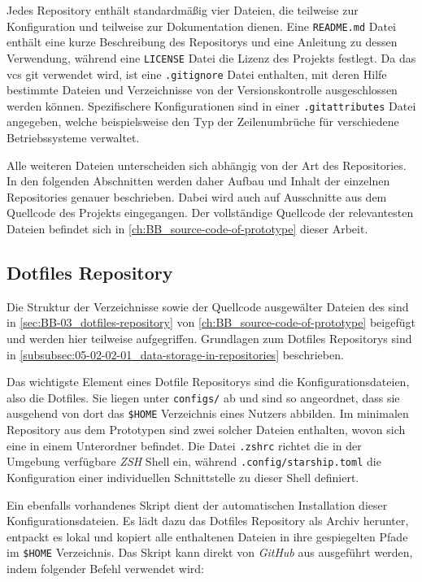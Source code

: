 Jedes Repository enthält standardmäßig vier Dateien, die teilweise zur Konfiguration und teilweise zur Dokumentation dienen. Eine \texttt{README.md} Datei enthält eine kurze Beschreibung des Repositorys und eine Anleitung zu dessen Verwendung, während eine \texttt{LICENSE} Datei die Lizenz des Projekts festlegt. Da das \Gls{vcs} \Gls{git} verwendet wird, ist eine \texttt{.gitignore} Datei enthalten, mit deren Hilfe bestimmte Dateien und Verzeichnisse von der Versionskontrolle ausgeschlossen werden können. Spezifischere Konfigurationen sind in einer \texttt{.gitattributes} Datei angegeben, welche beispielsweise den Typ der Zeilenumbrüche für verschiedene Betriebssysteme verwaltet.

Alle weiteren Dateien unterscheiden sich abhängig von der Art des Repositories. In den folgenden Abschnitten werden daher Aufbau und Inhalt der einzelnen Repositories genauer beschrieben. Dabei wird auch auf Ausschnitte aus dem Quellcode des Projekts eingegangen. Der vollständige Quellcode der relevantesten Dateien befindet sich in \autoref{ch:BB_source-code-of-prototype} dieser Arbeit.

\subsection{Dotfiles Repository}
\label{subsec:06-02-01_dotfiles-repository}

Die Struktur der Verzeichnisse sowie der Quellcode ausgewälter Dateien des  sind in \autoref{sec:BB-03_dotfiles-repository} von \autoref{ch:BB_source-code-of-prototype} beigefügt und werden hier teilweise aufgegriffen. Grundlagen zum Dotfiles Repositorys sind in \autoref{subsubsec:05-02-02-01_data-storage-in-repositories} beschrieben.

Das wichtigste Element eines Dotfile Repositorys sind die Konfigurationsdateien, also die Dotfiles. Sie liegen unter \texttt{configs/} ab und sind so angeordnet, dass sie ausgehend von dort das \texttt{\$HOME} Verzeichnis eines Nutzers abbilden. Im minimalen Repository aus dem Prototypen sind zwei solcher Dateien enthalten, wovon sich eine in einem Unterordner befindet. Die Datei \texttt{.zshrc} richtet die in der Umgebung verfügbare \textit{ZSH} Shell ein, während \texttt{.config/starship.toml} die Konfiguration einer individuellen Schnittstelle zu dieser Shell definiert.

Ein ebenfalls vorhandenes Skript  dient der automatischen Installation dieser Konfigurationsdateien. Es lädt dazu das Dotfiles Repository als Archiv herunter, entpackt es lokal und kopiert alle enthaltenen Dateien in ihre gespiegelten Pfade im \texttt{\$HOME} Verzeichnis. Das Skript kann direkt von \textit{GitHub} aus ausgeführt werden, indem folgender Befehl verwendet wird:

